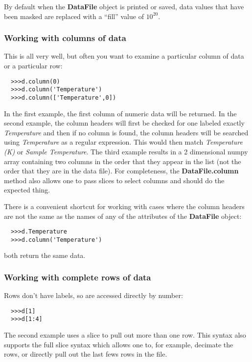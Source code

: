 \documentclass[a4paper,11pt]{scrartcl}
\begin{document}
By default when the \textbf{DataFile} object is printed or saved, data values that have been masked are replaced with a ``fill'' value of $10^{20}$.


\subsubsection{Working with columns of data}

This is all very well, but often you want to examine a particular column of data
or a particular row:
\begin{verbatim}
  >>>d.column(0)
  >>>d.column('Temperature')
  >>>d.column(['Temperature',0])
\end{verbatim}
In the first example, the first column of numeric data will be returned. In the
second example, the column headers will first be checked for one labeled exactly
\textit{Temperature} and then if no column is found, the column headers will be
searched using \textit{Temperature} as a regular expression. This would then
match \textit{Temperature (K)} or \textit{Sample Temperature}.  The third
example results in a 2 dimensional numpy array containing two columns in the
order that they appear in the list (\ie not the order that they are in the data
file). For completeness, the \textbf{DataFile.column} method also allows one to
pass slices to select columns and should do the expected thing.

There is a convenient shortcut for working with cases where the column headers are not the same
as the names of any of the attributes of the \textbf{DataFile} object:
\begin{verbatim}
  >>>d.Temperature
  >>>d.column('Temperature')
\end{verbatim}
both return the same data.

\subsubsection{Working with complete rows of data}

Rows don't have labels, so are accessed directly by number:
\begin{verbatim}
  >>>d[1]
  >>>d[1:4]
\end{verbatim}
The second example uses a slice to pull out more than one row. This syntax also
supports the full slice syntax which allows one to, for example, decimate the
rows, or directly pull out the last fews rows in the file.
\end{document}
